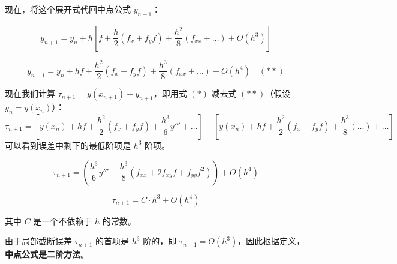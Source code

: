 \documentclass[11pt]{article}
\begin{document}
现在，将这个展开式代回中点公式 \(y_{n+1}\)：

\[ y_{n+1} = y_n + h \left[ f + \frac{h}{2}(f_x + f_y f) + \frac{h^2}{8}(f_{xx} + \dots) + O(h^3) \right] \]

\[ y_{n+1} = y_n + hf + \frac{h^2}{2}(f_x + f_y f) + \frac{h^3}{8}(f_{xx} + \dots) + O(h^4) \quad (**) \]

现在我们计算 \(\tau_{n+1} = y(x_{n+1}) - y_{n+1}\)，即用式 \((*)\)
减去式 \((**)\)（假设 \(y_n = y(x_n)\)）：
\[ \tau_{n+1} = \left[ y(x_n) + hf + \frac{h^2}{2}(f_x + f_y f) + \frac{h^3}{6}y''' + \dots \right] - \left[ y(x_n) + hf + \frac{h^2}{2}(f_x + f_y f) + \frac{h^3}{8}(\dots) + \dots \right] \]
可以看到误差中剩下的最低阶项是 \(h^3\) 阶项。

\[ \tau_{n+1} = \left(\frac{h^3}{6}y''' - \frac{h^3}{8}(f_{xx} + 2f_{xy}f + f_{yy}f^2)\right) + O(h^4) \]

\[ \tau_{n+1} = C \cdot h^3 + O(h^4) \]

其中 \(C\) 是一个不依赖于 \(h\) 的常数。

由于局部截断误差 \(\tau_{n+1}\) 的首项是 \(h^3\) 阶的，即
\(\tau_{n+1} = O(h^3)\)，因此根据定义，\textbf{中点公式是二阶方法}。


    
    
    
\end{document}
